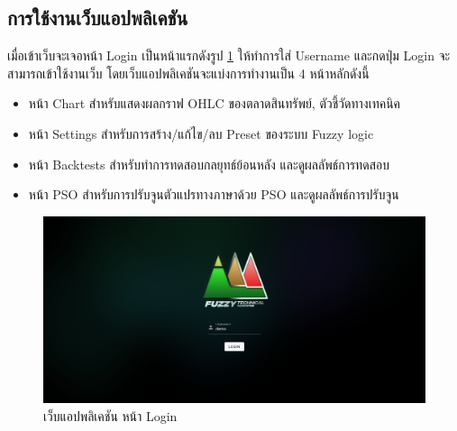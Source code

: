 \subsection{การใช้งานเว็บแอปพลิเคชัน}
เมื่อเข้าเว็บจะเจอหน้า Login เป็นหน้าแรกดังรูป \ref{fig:web-login} ให้ทำการใส่ Username และกดปุ่ม Login จะสามารถเข้าใช้งานเว็บ โดยเว็บแอปพลิเคชันจะแบ่งการทำงานเป็น 4 หน้าหลักดังนี้
\begin{itemize}
    \item หน้า Chart สำหรับแสดงผลกราฟ OHLC ของตลาดสินทรัพย์, ตัวชี้วัดทางเทคนิค
    \item หน้า Settings สำหรับการสร้าง/แก้ไข/ลบ Preset ของระบบ Fuzzy logic
    \item หน้า Backtests สำหรับทำการทดสอบกลยุทธ์ย้อนหลัง และดูผลลัพธ์การทดสอบ
    \item หน้า PSO สำหรับการปรับจูนตัวแปรทางภาษาด้วย PSO และดูผลลัพธ์การปรับจูน
\end{itemize}
\begin{figure}[ht]
    \centering
    \includegraphics[width=\textwidth]{images/web-tuts/login.PNG}
    \caption{เว็บแอปพลิเคชัน หน้า Login}
    \label{fig:web-login}
\end{figure}
\FloatBarrier

